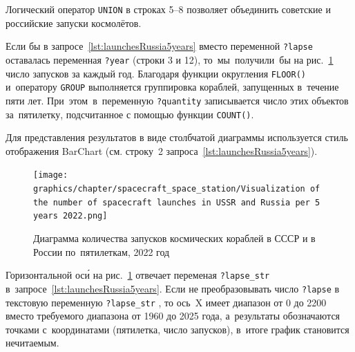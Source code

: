 Логический оператор \lstinline|UNION| в строках 5--8 
позволяет объединить советские и российские запуски космолётов. 

Если бы в запросе~\ref{lst:launchesRussia5years} 
вместо переменной \lstinline|?lapse| оставалась переменная \lstinline|?year| (строки 3 и 12), 
то~мы~получили~бы на рис.~\ref{fig:launchesRussia5years} 
число запусков за каждый год. 
Благодаря функции округления \mbox{\lstinline|FLOOR()|} 
и~оператору \lstinline|GROUP| выполняется группировка%
%
 кораблей, запущенных в~течение пяти лет. 
При~этом~в~переменную \mbox{\lstinline|?quantity|} записывается число этих объектов за~пятилетку, 
подсчитанное с помощью функции \lstinline|COUNT()|.

Для представления результатов в виде столбчатой диаграммы используется стиль отображения BarChart 
(см. строку~2 запроса~\ref{lst:launchesRussia5years}).




\begin{figure}[h!]
    \texttt{[image: graphics/chapter/spacecraft\_space\_station/Visualization of the number of spacecraft launches in USSR and Russia per 5 years 2022.png]}
    \caption[График запусков космических кораблей в СССР и России, 2022 год.]
            {Диаграмма количества запусков космических кораблей в СССР и в России по~пятилеткам, 2022 год}
    \label{fig:launchesRussia5years}%
\end{figure}



\newpage\phantom{blabla}

Горизонтальной ос\'{и} на рис.~\ref{fig:launchesRussia5years} 
отвечает переменая \mbox{\lstinline|?lapse_str|} в~запросе~\ref{lst:launchesRussia5years}. 
Если не преобразовывать число \lstinline|?lapse| 
в текстовую переменную \mbox{\lstinline|?lapse_str|}%
, то ось~X имеет диапазон от 0 до 2200 
вместо требуемого диапазона от 1960 до 2025 года, 
а~результаты обозначаются точками с~координатами (пятилетка, число запусков), 
в~итоге график становится нечитаемым. 

